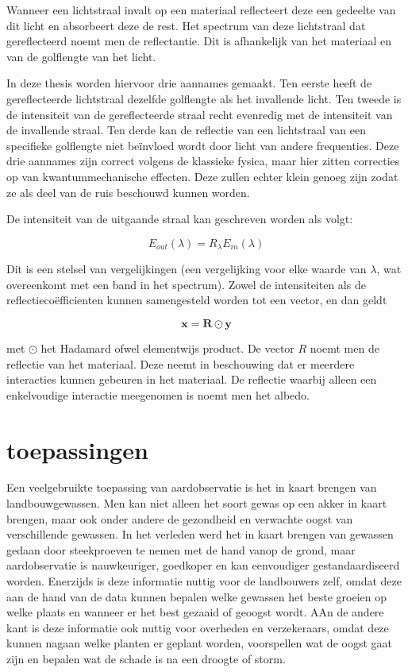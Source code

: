 \documentclass[12pt]{report}
\begin{document}
Wanneer een lichtstraal invalt op een materiaal reflecteert deze een gedeelte van dit licht en absorbeert deze de rest. Het spectrum van deze lichtstraal dat gereflecteerd noemt men de reflectantie. Dit is afhankelijk van het materiaal en van de golflengte van het licht. 

In deze thesis worden hiervoor drie aannames gemaakt. Ten eerste heeft de gereflecteerde lichtstraal dezelfde golflengte als het invallende licht. Ten tweede is de intensiteit van de gereflecteerde straal recht evenredig met de intensiteit van de invallende straal. Ten derde kan de reflectie van een lichtstraal van een specifieke golflengte niet be\"invloed wordt door licht van andere frequenties. Deze drie aannames zijn correct volgens de klassieke fysica, maar hier zitten correcties op van kwantummechanische effecten. Deze zullen echter klein genoeg zijn zodat ze als deel van de ruis beschouwd kunnen worden.

De intensiteit van de uitgaande straal kan geschreven worden als volgt:

\begin{equation}
E_{out}(\lambda) = R_\lambda E_{in}(\lambda)
\end{equation}

Dit is een stelsel van vergelijkingen (een vergelijking voor elke waarde van $\lambda$, wat overeenkomt met een band in het spectrum). Zowel de intensiteiten als de reflectieco\"efficienten kunnen samengesteld worden tot een vector, en dan geldt

\begin{equation}
\bm{x} = \bm{R}\odot \bm{y}
\end{equation}

met $\odot$ het Hadamard ofwel elementwijs product. De vector $R$ noemt men de reflectie van het materiaal. Deze neemt in beschouwing dat er meerdere interacties kunnen gebeuren in het materiaal. De reflectie waarbij alleen een enkelvoudige interactie meegenomen is noemt men het albedo.


\section{toepassingen}


Een veelgebruikte toepassing van aardobservatie is het in kaart brengen van landbouwgewassen\cite{fun}. Men kan niet alleen het soort gewas op een akker in kaart brengen, maar ook onder andere de gezondheid en verwachte oogst van verschillende gewassen. In het verleden werd het in kaart brengen van gewassen gedaan door steekproeven te nemen met de hand vanop de grond, maar aardobservatie is nauwkeuriger, goedkoper en kan eenvoudiger gestandaardiseerd worden. Enerzijds is deze informatie nuttig voor de landbouwers zelf, omdat deze aan de hand van de data kunnen bepalen welke gewassen het beste groeien op welke plaats en wanneer er het best gezaaid of geoogst wordt. AAn de andere kant is deze informatie ook nuttig voor overheden en verzekeraars, omdat deze kunnen nagaan welke planten er geplant worden,  voorspellen wat de oogst gaat zijn en bepalen wat de schade is na een droogte of storm. 
\end{document}
